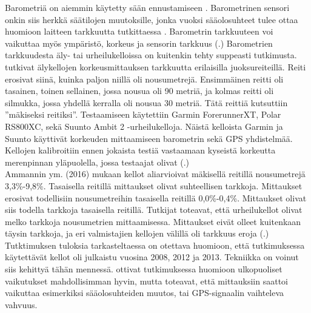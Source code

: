 \documentclass[utf8,bachelor,finnish]{bachelor}
\begin{document}
        Barometriä on aiemmin käytetty sään ennustamiseen \parencite{manivannan_challenges_2020}.
         Barometrinen sensori onkin siis herkkä säätilojen muutoksille, jonka vuoksi sääolosuhteet tulee ottaa huomioon laitteen tarkkuutta tutkittaessa \parencite{manivannan_challenges_2020, ammann_accuracy_2016}.
          Barometrin tarkkuuteen voi vaikuttaa myös ympäristö, korkeus ja sensorin tarkkuus (\cite{manivannan_challenges_2020}.)
           Barometrien tarkkuudesta äly- tai urheilukelloissa on kuitenkin tehty suppeasti tutkimusta.\\
           
    \textcite{ammann_accuracy_2016} tutkivat älykellojen korkeusmittauksen tarkkuutta erilaisilla juoksureiteillä. Reiti erosivat siinä, kuinka paljon niillä oli nousumetrejä.
     Ensimmäinen reitti oli tasainen, toinen sellainen, jossa nousua oli 90 metriä, ja kolmas reitti oli silmukka, jossa yhdellä kerralla oli nousua 30 metriä.
      Tätä reittiä kutsuttiin ''mäkiseksi reitiksi''.
       Testaamiseen käytettiin Garmin ForerunnerXT, Polar RS800XC, sekä Suunto Ambit 2 -urheilukelloja. Näistä kelloista Garmin ja
        Suunto käyttivät korkeuden mittaamiseen barometrin sekä GPS yhdistelmää.
         Kellojen kalibroitiin ennen jokaista testiä vastaamaan kyseistä korkeutta merenpinnan yläpuolella, jossa testaajat olivat (\cite{ammann_accuracy_2016}.)\\

    Ammannin ym. (2016) mukaan kellot aliarvioivat mäkisellä reitillä nousumetrejä 3,3\%-9,8\%. Tasaisella reitillä mittaukset olivat suhteellisen tarkkoja.
     Mittaukset erosivat todellisiin nousumetreihin tasaisella reitillä 0,0\%-0,4\%. Mittaukset olivat siis todella tarkkoja tasaisella reitillä.
      Tutkijat toteavat, että urheilukellot olivat melko tarkkoja nousumetrien mittaamisessa. Mittaukset eivät olleet kuitenkaan
       täysin tarkkoja, ja eri valmistajien kellojen välillä oli tarkkuus eroja (\cite{ammann_accuracy_2016}.)\\
       
    Tutktimuksen tuloksia tarkasteltaessa on otettava huomioon, että tutkimuksessa käytettävät kellot oli julkaistu vuosina 2008, 2012 ja 2013. Tekniikka on voinut siis kehittyä tähän mennessä. 
     \textcite{ammann_accuracy_2016} ottivat tutkimuksessa huomioon ulkopuoliset vaikutukset mahdollisimman hyvin, mutta toteavat, että mittauksiin
      saattoi vaikuttaa esimerkiksi sääolosuhteiden muutos, tai GPS-signaalin vaihteleva vahvuus.\\
\end{document}
